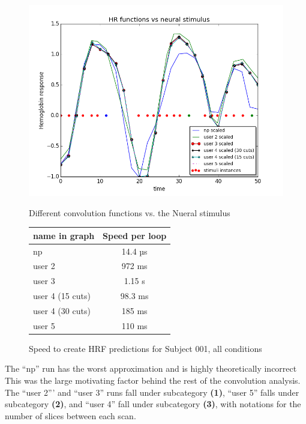 \begin{figure}[ht]
\centering
	\begin{minipage}[b]{0.45\linewidth}
		\centering
		\includegraphics[width=.8\linewidth]{images/convolution_vs_neural_stimulus}  
		\caption{\scriptsize{Different convolution functions vs. the Nueral stimulus}}
		\label{fig:convolution}

	\end{minipage}
\quad
	\begin{minipage}[b]{0.45\linewidth}
		\centering
		\begin{tabular}{|l | c|}
		\hline
		name in graph & Speed per loop \\
		\hline
		np    			 & 14.4 µs \\
		user 2     		 & 972 ms  \\
		user 3     		 & 1.15 s  \\
		user 4 (15 cuts) & 98.3 ms \\
		user 4 (30 cuts) & 185 ms  \\
		user 5     	 	 & 110 ms  \\
		\hline
		\end{tabular}
		\vspace{5mm}
		\caption{\scriptsize{Speed to create HRF predictions for Subject 001, all conditions}}
		\label{table:convolution}
	\end{minipage}
\end{figure}

The ``np'' run has the worst approximation and is highly theoretically incorrect 
This was the large motivating factor behind the rest of the convolution analysis. 
The ``user 2''' and ``user 3'' runs fall under subcategory \textbf{(1)}, 
``user 5'' falls under subcategory \textbf{(2)}, and ``user 4'' fall under 
subcategory \textbf{(3)}, with notations for the number of slices between each 
scan.

